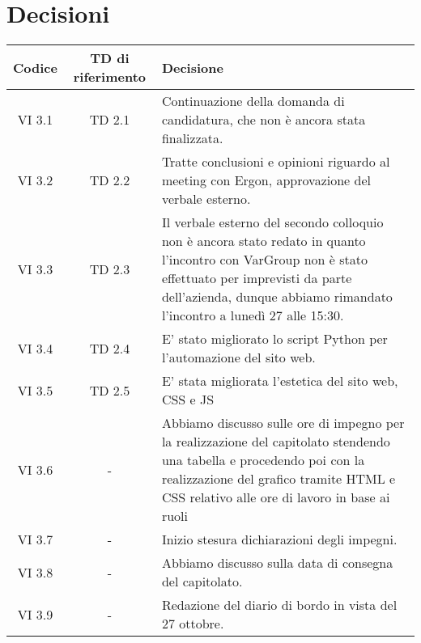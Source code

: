 \section{Decisioni}

	\begin{table}[htbp]
		\begin{tabular}{|c|c|p{}|}
			\hline
			\rowcolor[gray]{0.9}
			Codice & TD di riferimento & Decisione \\
                             \hline
			VI 3.1 & TD 2.1 & Continuazione della domanda di candidatura, che non è ancora stata finalizzata.\\
			\hline
			VI 3.2 & TD 2.2 & Tratte conclusioni e opinioni riguardo al meeting con Ergon, approvazione del verbale esterno.\\
			\hline
			VI 3.3 & TD 2.3 & Il verbale esterno del secondo colloquio non è ancora stato redato in quanto l'incontro con VarGroup non è stato effettuato per imprevisti da parte dell'azienda, dunque abbiamo rimandato l'incontro a lunedì 27 alle 15:30. \\
                              \hline
			VI 3.4 & TD 2.4 & E' stato migliorato lo script Python per l'automazione del sito web.\\
                              \hline
			VI 3.5 & TD 2.5 & E' stata migliorata l'estetica del sito web, CSS e JS \\
			\hline
			VI 3.6 & - & Abbiamo discusso sulle ore di impegno per la realizzazione del capitolato stendendo una tabella e procedendo poi con la realizzazione del grafico tramite HTML e CSS relativo alle ore di lavoro in base ai ruoli\\
			\hline
			VI 3.7 & - & Inizio stesura dichiarazioni degli impegni.\\
			\hline
			VI 3.8 & - &  Abbiamo discusso sulla data di consegna del capitolato.\\
			\hline
			VI 3.9 & - &  Redazione del diario di bordo in vista del 27 ottobre.\\
			\hline
		\end{tabular}
	\end{table}